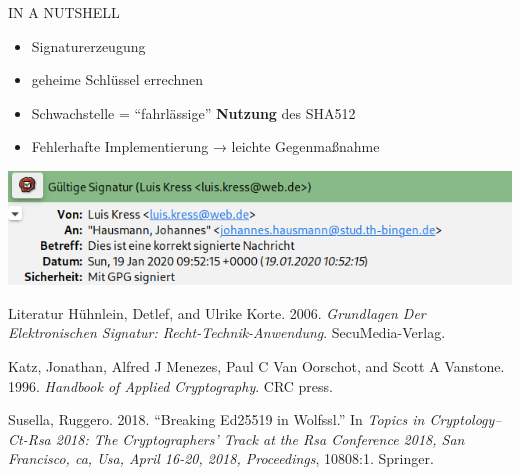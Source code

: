 \documentclass[
  10pt,
  ignorenonframetext,
  aspectratio=43,
]{beamer}
\providecommand{\tightlist}{%
  \setlength{\itemsep}{0pt}\setlength{\parskip}{0pt}}
\newlength{\cslhangindent}
\newenvironment{cslreferences}%
  {\setlength{\parindent}{0pt}%
  \everypar{\setlength{\hangindent}{\cslhangindent}}\ignorespaces}%
  {\par}
\begin{document}
\begin{frame}{IN A NUTSHELL}
\protect\hypertarget{in-a-nutshell}{}
\begin{itemize}
\tightlist
\item
  Signaturerzeugung
\end{itemize}

\pause

\begin{itemize}
\tightlist
\item
  geheime Schlüssel errechnen
\end{itemize}

\pause

\begin{itemize}
\tightlist
\item
  Schwachstelle = ``fahrlässige'' \textbf{Nutzung} des SHA512
\end{itemize}

\pause

\begin{itemize}
\tightlist
\item
  Fehlerhafte Implementierung → leichte Gegenmaßnahme
\end{itemize}
\end{frame}

\begin{frame}{}
\protect\hypertarget{section-25}{}
\includegraphics{Abbildungen/klsig.png}
\end{frame}

\begin{frame}{Literatur}
\protect\hypertarget{literatur}{}
\hypertarget{refs}{}
\begin{cslreferences}
\leavevmode\hypertarget{ref-huhnlein2006grundlagen}{}%
Hühnlein, Detlef, and Ulrike Korte. 2006. \emph{Grundlagen Der
Elektronischen Signatur: Recht-Technik-Anwendung}. SecuMedia-Verlag.

\leavevmode\hypertarget{ref-katz1996handbook}{}%
Katz, Jonathan, Alfred J Menezes, Paul C Van Oorschot, and Scott A
Vanstone. 1996. \emph{Handbook of Applied Cryptography}. CRC press.

\leavevmode\hypertarget{ref-susella2018breaking}{}%
Susella, Ruggero. 2018. ``Breaking Ed25519 in Wolfssl.'' In \emph{Topics
in Cryptology--Ct-Rsa 2018: The Cryptographers' Track at the Rsa
Conference 2018, San Francisco, ca, Usa, April 16-20, 2018,
Proceedings}, 10808:1. Springer.
\end{cslreferences}
\end{frame}
\end{document}
